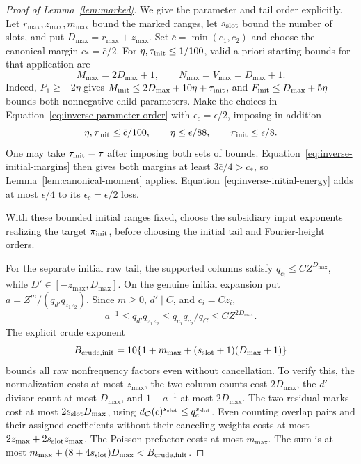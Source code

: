 \documentclass[12pt]{article}
\begin{document}
\begin{proof}[Proof of Lemma~\ref{lem:marked}]
We give the parameter and tail order explicitly.  Let
\(r_{\max},z_{\max},m_{\max}\) bound the marked ranges, let
\(s_{\rm slot}\) bound the number of slots, and put
\(D_{\max}=r_{\max}+z_{\max}\).  Set
\(\bar c=\min(c_1,c_2)\) and choose the canonical margin
\(c_*=\bar c/2\).  For \(\eta,\tau_{\rm init}\le1/100\), valid a priori
starting bounds for that application are
\[
 M_{\max}=2D_{\max}+1,\qquad N_{\max}=V_{\max}=D_{\max}+1.
\]
Indeed, \(P_1\ge-2\eta\) gives
\(M_{\rm init}\le2D_{\max}+10\eta+\tau_{\rm init}\), and
\(F_{\rm init}\le D_{\max}+5\eta\) bounds both nonnegative child
parameters.  Make the choices in Equation~\eqref{eq:inverse-parameter-order}
with \(\epsilon_c=\epsilon/2\), imposing in addition
\[
 \eta,\tau_{\rm init}\le\bar c/100,\qquad
 \eta\le\epsilon/88,\qquad \pi_{\rm init}\le\epsilon/8.
\]
One may take \(\tau_{\rm init}=\tau\) after imposing both sets of bounds.
Equation~\eqref{eq:inverse-initial-margins} then gives both margins at
least \(3\bar c/4>c_*\), so Lemma~\ref{lem:canonical-moment} applies.
Equation~\eqref{eq:inverse-initial-energy} adds at most \(\epsilon/4\)
to its \(\epsilon_c=\epsilon/2\) loss.

With these bounded initial ranges fixed, choose the subsidiary input
exponents realizing the target \(\pi_{\rm init}\), before choosing the
initial tail and Fourier-height orders.

For the separate initial raw tail, the supported columns satisfy
\(q_{c_i}\le C Z^{D_{\max}}\), while \(D'\in[-z_{\max},D_{\max}]\).
On the genuine initial expansion put
\(a=Z^m/(q_{d'}q_{z_1z_2})\).  Since \(m\ge0\), \(d'\mid C\), and
\(c_i=Cz_i\),
\[
 a^{-1}\le q_{d'}q_{z_1z_2}
       \le q_{c_1}q_{c_2}/q_C\le C Z^{2D_{\max}}.
\]
The explicit crude exponent
\[
 B_{\rm crude,init}=10\{1+m_{\max}+(s_{\rm slot}+1)(D_{\max}+1)\}
\]
bounds all raw nonfrequency factors even without cancellation.  To verify
this, the normalization costs at most \(z_{\max}\), the two column counts
cost \(2D_{\max}\), the \(d'\)-divisor count at most \(D_{\max}\), and
\(1+a^{-1}\) at most \(2D_{\max}\).  The two residual marks cost at most
\(2s_{\rm slot}D_{\max}\), using \(d_{\mathcal O}(c)^{s_{\rm slot}}\le q_c^{s_{\rm slot}}\).
Even counting overlap pairs and their assigned coefficients without
their canceling weights costs at most
\(2z_{\max}+2s_{\rm slot}z_{\max}\).  The Poisson prefactor costs at most
\(m_{\max}\).  The sum is at most
\(m_{\max}+(8+4s_{\rm slot})D_{\max}<B_{\rm crude,init}\).


\end{proof}
\end{document}
